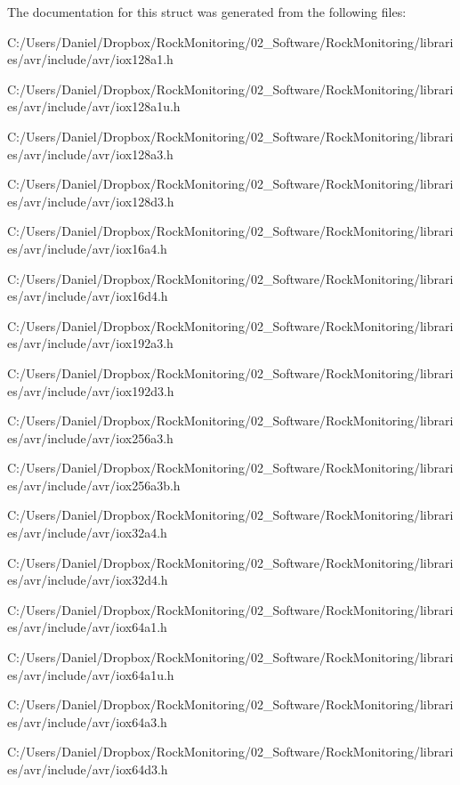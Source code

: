 The documentation for this struct was generated from the following files\+:\begin{DoxyCompactItemize}
\item 
C\+:/\+Users/\+Daniel/\+Dropbox/\+Rock\+Monitoring/02\+\_\+\+Software/\+Rock\+Monitoring/libraries/avr/include/avr/iox128a1.\+h\item 
C\+:/\+Users/\+Daniel/\+Dropbox/\+Rock\+Monitoring/02\+\_\+\+Software/\+Rock\+Monitoring/libraries/avr/include/avr/iox128a1u.\+h\item 
C\+:/\+Users/\+Daniel/\+Dropbox/\+Rock\+Monitoring/02\+\_\+\+Software/\+Rock\+Monitoring/libraries/avr/include/avr/iox128a3.\+h\item 
C\+:/\+Users/\+Daniel/\+Dropbox/\+Rock\+Monitoring/02\+\_\+\+Software/\+Rock\+Monitoring/libraries/avr/include/avr/iox128d3.\+h\item 
C\+:/\+Users/\+Daniel/\+Dropbox/\+Rock\+Monitoring/02\+\_\+\+Software/\+Rock\+Monitoring/libraries/avr/include/avr/iox16a4.\+h\item 
C\+:/\+Users/\+Daniel/\+Dropbox/\+Rock\+Monitoring/02\+\_\+\+Software/\+Rock\+Monitoring/libraries/avr/include/avr/iox16d4.\+h\item 
C\+:/\+Users/\+Daniel/\+Dropbox/\+Rock\+Monitoring/02\+\_\+\+Software/\+Rock\+Monitoring/libraries/avr/include/avr/iox192a3.\+h\item 
C\+:/\+Users/\+Daniel/\+Dropbox/\+Rock\+Monitoring/02\+\_\+\+Software/\+Rock\+Monitoring/libraries/avr/include/avr/iox192d3.\+h\item 
C\+:/\+Users/\+Daniel/\+Dropbox/\+Rock\+Monitoring/02\+\_\+\+Software/\+Rock\+Monitoring/libraries/avr/include/avr/iox256a3.\+h\item 
C\+:/\+Users/\+Daniel/\+Dropbox/\+Rock\+Monitoring/02\+\_\+\+Software/\+Rock\+Monitoring/libraries/avr/include/avr/iox256a3b.\+h\item 
C\+:/\+Users/\+Daniel/\+Dropbox/\+Rock\+Monitoring/02\+\_\+\+Software/\+Rock\+Monitoring/libraries/avr/include/avr/iox32a4.\+h\item 
C\+:/\+Users/\+Daniel/\+Dropbox/\+Rock\+Monitoring/02\+\_\+\+Software/\+Rock\+Monitoring/libraries/avr/include/avr/iox32d4.\+h\item 
C\+:/\+Users/\+Daniel/\+Dropbox/\+Rock\+Monitoring/02\+\_\+\+Software/\+Rock\+Monitoring/libraries/avr/include/avr/iox64a1.\+h\item 
C\+:/\+Users/\+Daniel/\+Dropbox/\+Rock\+Monitoring/02\+\_\+\+Software/\+Rock\+Monitoring/libraries/avr/include/avr/iox64a1u.\+h\item 
C\+:/\+Users/\+Daniel/\+Dropbox/\+Rock\+Monitoring/02\+\_\+\+Software/\+Rock\+Monitoring/libraries/avr/include/avr/iox64a3.\+h\item 
C\+:/\+Users/\+Daniel/\+Dropbox/\+Rock\+Monitoring/02\+\_\+\+Software/\+Rock\+Monitoring/libraries/avr/include/avr/iox64d3.\+h\end{DoxyCompactItemize}
